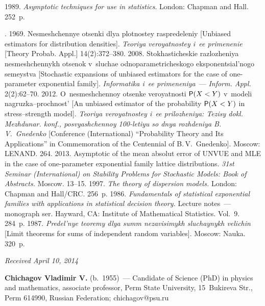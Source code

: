 \begin{multicols}{2}
{{\begin{thebibliography}{99}
 1989. \textit{Asymptotic techniques for use in statistics}.
London: Chapman and Hall. 252~p.

. 1969.
 Nesmeshchennye otsenki dlya plotnostey raspredeleniy
 [Unbiased estimators for distribution densities].
\textit{Teoriya veroyatnostey i~ee primenenie}
[Theory Probab. Appl.] 14(2):372--380.
 2008.
 Stokhasticheskie razlozheniya nesmeshchennykh otsenok v~sluchae odnopara\-met\-ri\-che\-sko\-go eksponentsial'nogo semeystva
 [Stochastic expansions of unbiased estimators for the case of one-parameter exponential family].
\textit{Informatika i~ee primeneniya}~--- \textit{Inform. Appl.} 2(2):62--70.
 2012.
 O~nesmeshchennoy otsenke ve\-ro\-yat\-nosti ${\sf P}(X<Y)$ v~modeli nagruzka--prochnost'
 [An unbiased estimator of the probability ${\sf P}(X<Y)$ in stress--strength model].
\textit{Teoriya veroyatnostey  i~ee prilozheniya: Tezisy dokl.
 Mezhdunar. konf., posvyashchennoy 100-letiyu so dnya
  rozhdeniya B.\,V.~Gnedenko}
 [Conference (International) ``Probability Theory and Its Applications''
 in Commemoration of the Centennial of B.\,V.~Gnedenko].
 Moscow: LENAND. 264.
 2013.
 Asymptotic of the mean absolut error of UNVUE and MLE in the case of one-parameter exponential family lattice
 distributions.
\textit{31st  Seminar (International) on Stability Problems for
 Stochastic Models: Book of Abstracts.}
 Moscow. 13--15.
 1997.
\textit{The theory of dispersion models.}
 London: Chapman and Hall/CRC. 256~p.
 1986.
\textit{Fundamentals of statistical exponential families with applications in statistical decision theory.}
 Lecture notes~--- monograph ser. 
 Hayward, CA: Institute of Mathematical Statistics. Vol.~9. 284~p.
 1987.
\textit{Predel'nye teoremy dlya summ nezavisimykh sluchaynykh velichin}
 [Limit theorems for sums of independent random variables].
 Moscow: Nauka. 320~p.
\end{thebibliography}

 }
 }

\end{multicols}

\vspace*{-6pt}

\hfill{\small\textit{Received April 10, 2014}}






\Contrl

\noindent
\textbf{Chichagov Vladimir V.} (b.\ 1955)~---
 Candidate of Science (PhD) in physics and mathematics, associate professor, 
 Perm State University, 15~Bukireva Str., Perm 614990, Russian Federation; 
 chichagov@psu.ru

\label{end\stat}


\renewcommand{\bibname}{\protect\rm Литература}